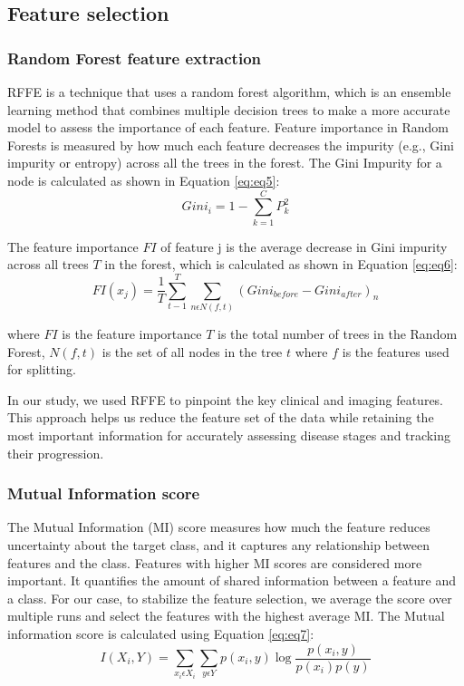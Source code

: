\documentclass[twocolumn]{article}
\begin{document}
\subsection{Feature selection}
\subsubsection{Random Forest feature extraction}

RFFE is a technique that uses a random forest algorithm, which is an ensemble learning method that combines multiple decision trees to make a more accurate model to assess the importance of each feature. Feature importance in Random Forests is measured by how much each feature decreases the impurity (e.g., Gini impurity or entropy) across all the trees in the forest. The Gini Impurity for a node is calculated as shown in Equation \eqref{eq:eq5}:
\begin{equation}
    Gini_i = 1 - \sum_{k=1}^{C}P_k^2
    \label{eq:eq5}
\end{equation}

The feature importance $FI$ of feature j is the average decrease in Gini impurity across all trees $T$ in the forest, which is calculated as shown in Equation \eqref{eq:eq6}:
\begin{equation}
    FI(x_j) = \frac{1}{T}\sum_{t-1}^{T}\sum_{n\epsilon N(f,t)}(Gini_{before} - Gini_{after})_n
    \label{eq:eq6}
\end{equation}

where $FI$ is the feature importance $T$ is the total number of trees in the Random Forest, $N(f,t)$ is the set of all nodes in the tree $t$ where $f$ is the features used for splitting.

In our study, we used RFFE to pinpoint the key clinical and imaging features. This approach helps us reduce the feature set of the data while retaining the most important information for accurately assessing disease stages and tracking their progression.

\subsubsection{Mutual Information score}

The Mutual Information (MI) score measures how much the feature reduces uncertainty about the target class, and it captures any relationship between features and the class. Features with higher MI scores are considered more important. It quantifies the amount of shared information between a feature and a class. For our case, to stabilize the feature selection, we average the score over multiple runs and select the features with the highest average MI. The Mutual information score is calculated using Equation \eqref{eq:eq7}:
\begin{equation}
    I(X_i, Y) = \sum_{x_i\epsilon X_i}\sum_{y\epsilon Y}p(x_i, y)\log\frac{p(x_i, y)}{p(x_i)p(y)}
    \label{eq:eq7}
\end{equation}
\end{document}
